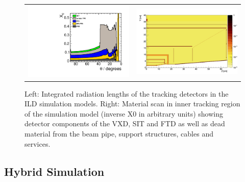 
\begin{figure}[b!]
\begin{tabular}{cc}
\includegraphics[width=0.4\hsize]{Modelling/fig/ILD_l5_v02_matbudget_tracker_85deg.pdf} &
\includegraphics[width=0.6\hsize]{Modelling/fig/ILD_large_inner_tracker_x0_scan.png}
\end{tabular}
\caption{\label{fig:sim_large_small}Left: Integrated radiation lengths of the tracking detectors in the ILD simulation models.
  Right: Material scan in inner tracking region of the simulation model (inverse X0 in arbitrary units) showing detector components of the VXD, SIT and FTD as well
  as dead material from the beam pipe, support structures, cables and services.}
\end{figure}


\subsection{Hybrid Simulation}

